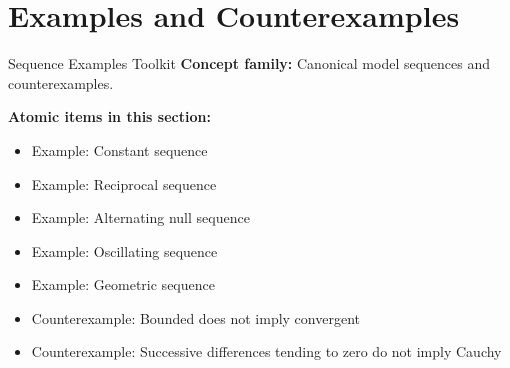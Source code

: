 \section{Examples and Counterexamples}

\begin{toolkitbox}{Sequence Examples Toolkit}
\textbf{Concept family:} Canonical model sequences and counterexamples.

\medskip
\textbf{Atomic items in this section:}
\begin{itemize}
  \item Example: Constant sequence
  \item Example: Reciprocal sequence
  \item Example: Alternating null sequence
  \item Example: Oscillating sequence
  \item Example: Geometric sequence
  \item Counterexample: Bounded does not imply convergent
  \item Counterexample: Successive differences tending to zero do not imply Cauchy
\end{itemize}
\end{toolkitbox}


